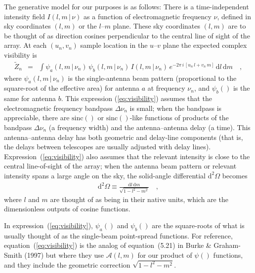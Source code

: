 \documentclass[12pt]{article}
\renewcommand{\exp}[1]{e^{#1}}
\newcommand{\sinc}{\mathrm{sinc}}
\newcommand{\given}{\,|\,}
\newcommand{\expectation}[1]{\tilde{#1}}
\newcommand{\dd}{\mathrm{d}}
\begin{document}
The generative model for our purposes is as follows: There is a
time-independent intensity field $I(l,m\given\nu)$ as a function of
electromagnetic frequency $\nu$, defined in sky coordinates $(l,m)$ or
the $l$--$m$ plane.  These sky coordinates $(l, m)$ are to be thought
of as direction cosines perpendicular to the central line of sight of
the array.  At each $(u_n, v_n)$ sample location in the $u$--$v$ plane
the expected complex visibility is
\begin{eqnarray}
\label{eq:visibility}
\expectation{Z}_n &=& \int \psi_a(l,m\given\nu_n)\,\psi_b(l,m\given\nu_n)\,I(l,m\given\nu_n)
                         \,\exp{-2\pi\,i\,[u_n\,l + v_n\,m]}\,\dd l\,\dd m
\quad ,
\end{eqnarray}
where $\psi_a(l,m\given\nu_n)$ is the single-antenna beam pattern
(proportional to the square-root of the effective area) for antenna
$a$ at frequency $\nu_n$, and $\psi_b()$ is the same for antenna $b$.
This expression (\ref{eq:visibility}) assumes that the electromagnetic
frequency bandpass $\Delta\nu_n$ is small; when the bandpass is
appreciable, there are $\sinc()$ or $\sinc()$-like functions of
products of the bandpass $\Delta\nu_n$ (a frequency width) and the
antenna--antenna delay (a time).  This antenna--antenna delay has both
geometric and delay-line components (that is, the delays between
telescopes are usually adjusted with delay lines).
Expression~(\ref{eq:visibility}) also assumes that the relevant
intensity is close to the central line-of-sight of the array; when the
antenna beam pattern or relevant intensity spans a large angle on the
sky, the solid-angle differential $\dd^2\Omega$ becomes
\begin{eqnarray}
\dd^2\Omega \equiv \frac{\dd l\,\dd m}{\sqrt{1-l^2-m^2}}
\quad ,
\end{eqnarray}
where $l$ and $m$ are thought of as being in their native units, which
are the dimensionless outputs of cosine functions.

In expression~(\ref{eq:visibility}), $\psi_a()$ and $\psi_b()$ are the
square-roots of what is usually thought of as the single-beam
point-spread functions.  For reference, equation~(\ref{eq:visibility})
is the analog of equation~(5.21) in Burke \& Graham-Smith (1997) but
where they use $\mathscr{A}(l,m)$ for our product of $\psi()$ functions,
and they include the geometric correction $\sqrt{1-l^2-m^2}$.
\end{document}
